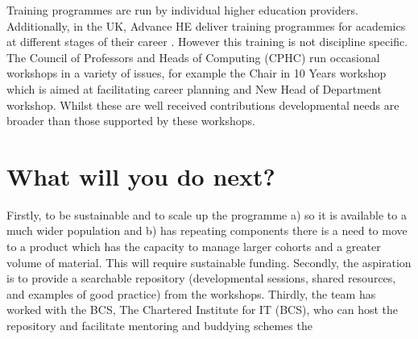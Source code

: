 \documentclass[sigconf]{acmart}
\begin{document}
Training programmes are run by individual higher education
providers. Additionally, in the UK, Advance HE deliver training
programmes for academics at different stages of their career
\cite{HEATraining}. However this training is not discipline
specific. The Council of Professors and Heads of Computing (CPHC) run
occasional workshops in a variety of issues, for example the Chair in
10 Years workshop which is aimed at facilitating career planning and
New Head of Department workshop. Whilst these are well received
contributions developmental needs are broader than those supported by
these workshops.


\section{What will you do next?}
\begin{comment}

Scaling up


Funding 


Shared CPD learning materials


Address EDI issues in computer science


Reverse mentoring


Align with BCS


Special interest group

Web space for repository and functionality (mentoring, buddying) to store CPD sessions, shared resources for new CS academics, examples of good practice and a discussion space.

Explore what BCS are doing with professionals in non academic roles

Encourage research on pedagogy and educational issues in CS

Examine if programme framework is transferrable to other disciplines
\end{comment}
Firstly, to be sustainable and to scale up the programme a) so it is
available to a much wider population and b) has repeating components
there is a need to move to a product which has the capacity to manage
larger cohorts and a greater volume of material. This will require
sustainable funding. Secondly, the aspiration is to provide a
searchable repository (developmental sessions, shared resources, and
examples of good practice) from the workshops. Thirdly, the team has
worked with the BCS, The Chartered Institute for IT (BCS), who can
host the repository and facilitate mentoring and buddying schemes the
\end{document}

